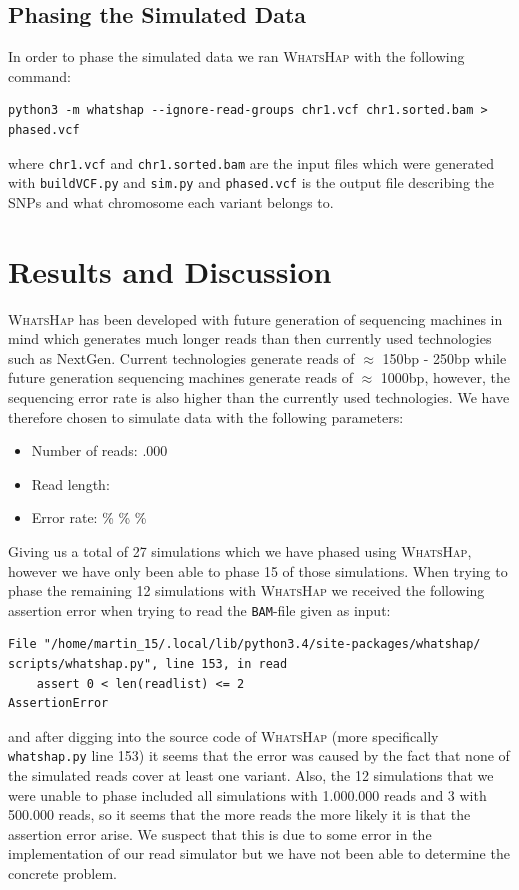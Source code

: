 \documentclass[10pt,a4paper]{article}
\begin{document}
\subsection{Phasing the Simulated Data}
In order to phase the simulated data we ran \textsc{WhatsHap} with the following command:
\begin{lstlisting}
python3 -m whatshap --ignore-read-groups chr1.vcf chr1.sorted.bam > phased.vcf
\end{lstlisting}
where \texttt{chr1.vcf} and \texttt{chr1.sorted.bam} are the input files which were generated with \texttt{buildVCF.py} and \texttt{sim.py} and \texttt{phased.vcf} is the output file describing the SNPs and what chromosome each variant belongs to.

\section{Results and Discussion}
\textsc{WhatsHap} has been developed with future generation of sequencing machines in mind which generates much longer reads than then currently used technologies such as NextGen. Current technologies generate reads of $\approx$ 150bp - 250bp while future generation sequencing machines generate reads of $\approx$ 1000bp, however, the sequencing error rate is also higher than the currently used technologies. We have therefore chosen to simulate data with the following parameters:
\begin{itemize}
\item Number of reads:
.000
\item Read length:
\item Error rate:
\%
\%
\%
\end{itemize}
Giving us a total of 27 simulations which we have phased using \textsc{WhatsHap}, however we have only been able to phase 15 of those simulations. When trying to phase the remaining 12 simulations with \textsc{WhatsHap} we received the following assertion error when trying to read the \texttt{BAM}-file given as input:
\begin{lstlisting}
File "/home/martin_15/.local/lib/python3.4/site-packages/whatshap/ scripts/whatshap.py", line 153, in read
    assert 0 < len(readlist) <= 2
AssertionError
\end{lstlisting}
and after digging into the source code of \textsc{WhatsHap} (more specifically \texttt{whatshap.py} line 153) it seems that the error was caused by the fact that none of the simulated reads cover at least one variant. Also, the 12 simulations that we were unable to phase included all simulations with 1.000.000 reads and 3 with 500.000 reads, so it seems that the more reads the more likely it is that the assertion error arise. We suspect that this is due to some error in the implementation of our read simulator but we have not been able to determine the concrete problem.
\end{document}
